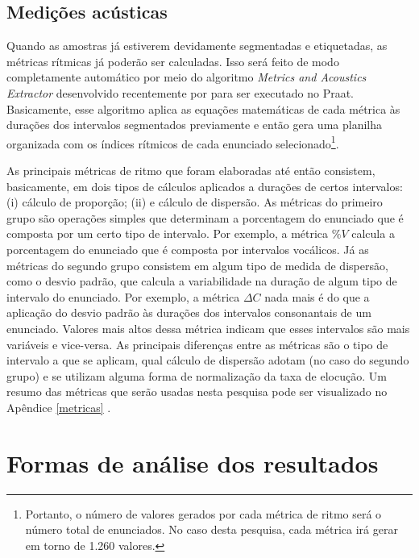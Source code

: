 \documentclass[
		a4paper,	%
		12pt,		%
		]{article}	%
\begin{document}
	\subsection{Medições acústicas} \label{medicoes}

	Quando as amostras já estiverem devidamente segmentadas e etiquetadas, as
	métricas rítmicas já poderão ser calculadas. Isso será feito de modo
	completamente automático por meio do algoritmo \emph{Metrics and Acoustics
		Extractor} desenvolvido recentemente por \citet{Junior.Barbosa2019} para
	ser executado no Praat. Basicamente, esse algoritmo aplica as equações
	matemáticas de cada métrica às durações dos intervalos segmentados
	previamente e então gera uma planilha organizada com os índices rítmicos de
	cada enunciado selecionado\footnote{Portanto, o número de valores gerados
		por cada métrica de ritmo será o número total de enunciados. No caso
		desta pesquisa, cada métrica irá gerar em torno de 1.260 valores.}.

	As principais métricas de ritmo que foram elaboradas até então consistem,
	basicamente, em dois tipos de cálculos aplicados a durações de certos
	intervalos: (i) cálculo de proporção; (ii) e cálculo de dispersão. As
	métricas do primeiro grupo são operações simples que determinam a
	porcentagem do enunciado que é composta por um certo tipo de intervalo. Por
	exemplo, a métrica $\%V$ \citep{Ramus.etal1999} calcula a porcentagem do
	enunciado que é composta por intervalos vocálicos. Já as métricas do segundo
	grupo consistem em algum tipo de medida de dispersão, como o desvio padrão,
	que calcula a variabilidade na duração de algum tipo de intervalo do
	enunciado. Por exemplo, a métrica $\Delta C$ \citep{Ramus.etal1999} nada
	mais é do que a aplicação do desvio padrão às durações dos intervalos
	consonantais de um enunciado. Valores mais altos dessa métrica indicam que
	esses intervalos são mais variáveis e vice-versa. As principais diferenças
	entre as métricas são o tipo de intervalo a que se aplicam, qual cálculo de
	dispersão adotam (no caso do segundo grupo) e se utilizam alguma forma de
	normalização da taxa de elocução. Um resumo das métricas que serão
	usadas nesta pesquisa pode ser visualizado no Apêndice \ref{metricas} .

	\section{Formas de análise dos resultados} \label{analise}
\end{document}
